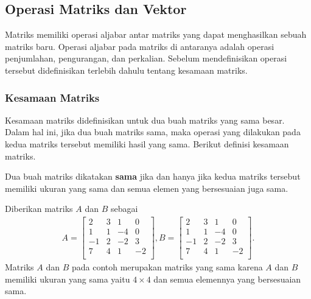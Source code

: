\subsection{Operasi Matriks dan Vektor}

Matriks memiliki operasi aljabar antar matriks yang dapat menghasilkan sebuah \mbox{matriks} baru. Operasi aljabar pada matriks di antaranya adalah operasi \mbox{penjumlahan}, pengurangan, dan perkalian. Sebelum mendefinisikan operasi tersebut didefinisikan terlebih dahulu tentang kesamaan matriks.

\subsubsection{Kesamaan Matriks}

Kesamaan matriks didefinisikan untuk dua buah matriks yang sama besar. Dalam hal ini, jika dua buah matriks sama, maka operasi yang dilakukan pada kedua matriks tersebut memiliki hasil yang sama. Berikut definisi kesamaan matriks.

\begin{definisi}
Dua buah matriks dikatakan \textbf{sama} jika dan hanya jika kedua \mbox{matriks} tersebut memiliki ukuran yang sama dan semua elemen yang bersesuaian juga \mbox{sama}.
\end{definisi}

\begin{contoh}
Diberikan matriks $A$ dan $B$ sebagai
\begin{align*}    
A=
\begin{bmatrix}
2 & 3 & 1 & 0\\
1 & 1 & -4 & 0\\
-1 & 2 & -2 & 3\\
7 & 4 & 1 & -2\\ 
\end{bmatrix}
,B=
\begin{bmatrix}
2 & 3 & 1 & 0\\
1 & 1 & -4 & 0\\
-1 & 2 & -2 & 3\\
7 & 4 & 1 & -2\\ 
\end{bmatrix}.
\end{align*}
Matriks $A$ dan $B$ pada contoh merupakan matriks yang sama karena $A$ dan $B$ memiliki ukuran yang sama yaitu $4 \times 4$ dan semua elemennya yang bersesuaian sama.
\end{contoh}

